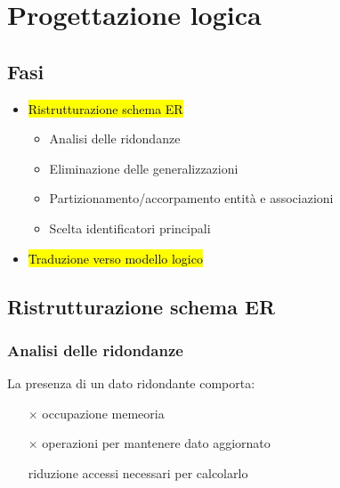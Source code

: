 \documentclass[a4paper]{article}
\begin{document}
\section{Progettazione logica}
\subsection*{Fasi}
\begin{itemize}[noitemsep, leftmargin=*]
  \item \hl{Ristrutturazione schema ER}
        \begin{itemize}[noitemsep]
          \item Analisi delle ridondanze
          \item Eliminazione delle generalizzazioni
          \item Partizionamento/accorpamento entità e associazioni
          \item Scelta identificatori principali
        \end{itemize}
  \item \hl{Traduzione verso modello logico}
\end{itemize}

\subsection{Ristrutturazione schema ER}
\subsubsection{Analisi delle ridondanze}
La presenza di un dato ridondante comporta:
\begin{itemize}[noitemsep]
  \item[$\times$] occupazione memeoria
  \item[$\times$] operazioni per mantenere dato aggiornato
  \item[\checkmark] riduzione accessi necessari per calcolarlo
\end{itemize}
\end{document}
